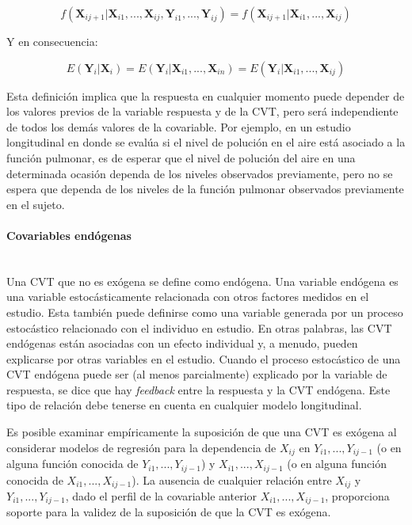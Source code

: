 \documentclass[spanish]{article}
\numberwithin{figure}{subsection}
\numberwithin{equation}{subsection}
\numberwithin{table}{subsection}
\begin{document}
\begin{equation}
	\label{exogeneidad}
	f(\bm{X}_{ij+1}|\bm{X}_{i1}, ..., \bm{X}_{ij}, \bm{Y}_{i1}, ..., \bm{Y}_{ij}) =
	f(\bm{X}_{ij+1}|\bm{X}_{i1}, ..., \bm{X}_{ij})
\end{equation}

Y en consecuencia:

\begin{equation}
	\label{exogeneidad debil}
	E(\bm{Y}_i|\bm{X}_i) = E(\bm{Y}_i|\bm{X}_{i1}, ..., \bm{X}_{in}) = E(\bm{Y}_i|\bm{X}_{i1}, ..., \bm{X}_{ij})
\end{equation}

Esta definición implica que la respuesta en cualquier momento puede depender de
los valores previos de la variable respuesta y de la CVT, pero será
independiente de todos los demás valores de la covariable. Por ejemplo, en un
estudio longitudinal en donde se evalúa si el nivel de polución en el aire está
asociado a la función pulmonar, es de esperar que el nivel de polución del aire
en una determinada ocasión dependa de los niveles observados previamente, pero
no se espera que dependa de los niveles de la función pulmonar observados
previamente en el sujeto.

\paragraph{Covariables endógenas} \mbox{} \\

Una CVT que no es exógena se define como endógena. Una variable endógena es una
variable estocásticamente relacionada con otros factores medidos en el estudio.
Esta también puede definirse como una variable generada por un proceso
estocástico relacionado con el individuo en estudio. En otras palabras, las CVT
endógenas están asociadas con un efecto individual y, a menudo, pueden
explicarse por otras variables en el estudio. Cuando el proceso estocástico de
una CVT endógena puede ser (al menos parcialmente) explicado por la variable de
respuesta, se dice que hay \textit{feedback} entre la respuesta y la CVT
endógena. Este tipo de relación debe tenerse en cuenta en cualquier modelo
longitudinal.

Es posible examinar empíricamente la suposición de que una CVT es exógena al
considerar modelos de regresión para la dependencia de $X_{ij}$ en
$Y_{i1}, ..., Y_{ij-1}$ (o en alguna función conocida de
$Y_{i1}, ..., Y_{ij-1}$) y $X_{i1}, ..., X_{ij-1}$ (o en alguna función conocida
de $X_{i1}, ..., X_{ij-1}$). La ausencia de cualquier relación entre $X_{ij}$ y
$Y_{i1}, ..., Y_{ij-1}$, dado el perfil de la covariable anterior
$X_{i1}, ..., X_{ij-1}$, proporciona soporte para la validez de la suposición de
que la CVT es exógena.
\end{document}

